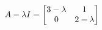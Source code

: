 \documentclass[preview]{standalone}
\begin{document}
\begin{align*}
\special{dvisvgm:raw <g id='unique000'>}A - \lambda I = \begin{bmatrix} 3-\lambda & 1 \\ 0 & 2-\lambda \end{bmatrix}\special{dvisvgm:raw </g>}
\end{align*}
\end{document}
